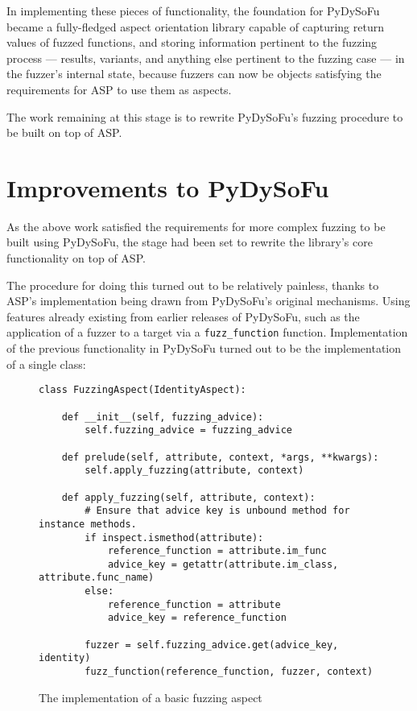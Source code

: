 \documentclass[draft]{article}
\begin{document}
In implementing these pieces of functionality, the foundation for PyDySoFu
became a fully-fledged aspect orientation library capable of capturing return
values of fuzzed functions, and storing information pertinent to the fuzzing
process --- results, variants, and anything else pertinent to the fuzzing case
--- in the fuzzer's internal state, because fuzzers can now be objects
satisfying the requirements for ASP to use them as aspects.\par

The work remaining at this stage is to rewrite PyDySoFu's fuzzing procedure to
be built on top of ASP.\par



\section{Improvements to PyDySoFu}
\label{sec:pdsf_improvements}
As the above work satisfied the requirements for more complex fuzzing to be
built using PyDySoFu, the stage had been set to rewrite the library's core
functionality on top of ASP.\par

The procedure for doing this turned out to be relatively painless, thanks to
ASP's implementation being drawn from PyDySoFu's original mechanisms. Using
features already existing from earlier releases of PyDySoFu, such as the
application of a fuzzer to a target via a \texttt{fuzz\_function} function.
Implementation of the previous functionality in PyDySoFu turned out to be the
implementation of a single class:


\begin{figure}
  \begin{lstlisting}
class FuzzingAspect(IdentityAspect):

    def __init__(self, fuzzing_advice):
        self.fuzzing_advice = fuzzing_advice

    def prelude(self, attribute, context, *args, **kwargs):
        self.apply_fuzzing(attribute, context)

    def apply_fuzzing(self, attribute, context):
        # Ensure that advice key is unbound method for instance methods.
        if inspect.ismethod(attribute):
            reference_function = attribute.im_func
            advice_key = getattr(attribute.im_class, attribute.func_name)
        else:
            reference_function = attribute
            advice_key = reference_function

        fuzzer = self.fuzzing_advice.get(advice_key, identity)
        fuzz_function(reference_function, fuzzer, context)
  \end{lstlisting}
  \label{fig:fuzzing_aspect_code}
  \caption{The implementation of a basic fuzzing aspect}
\end{figure}
\end{document}
